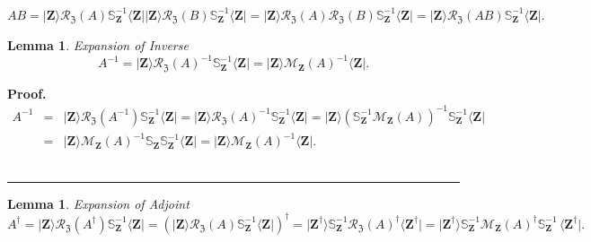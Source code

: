 \documentclass[aps, preprint]{revtex4}
\newtheorem{lemma}[theorem]{Lemma}
\newenvironment{proof}[1][Proof]{\noindent\textbf{#1.} }{\ \rule{0.5em}{0.5em}}
\begin{document}
\begin{equation}A B =\vert \mathbf{Z} \rangle \mathcal{R}_{\mathfrak{Z}} \left (A\right ) \mathbb{S}_{\mathbf{Z}}^{ -1} \langle \mathbf{Z}\vert \vert \mathbf{Z} \rangle \mathcal{R}_{\mathfrak{Z}} \left (B\right ) \mathbb{S}_{\mathbf{Z}}^{ -1} \langle \mathbf{Z}\vert  =\vert \mathbf{Z} \rangle \mathcal{R}_{\mathfrak{Z}} \left (A\right ) \mathcal{R}_{\mathfrak{Z}} \left (B\right ) \mathbb{S}_{\mathbf{Z}}^{ -1} \langle \mathbf{Z}\vert  =\vert \mathbf{Z} \rangle \mathcal{R}_{\mathfrak{Z}} \left (A B\right ) \mathbb{S}_{\mathbf{Z}}^{ -1} \langle \mathbf{Z}\vert \text{.}
\end{equation}


\begin{lemma}
Expansion of Inverse
\begin{equation}A^{ -1} =\vert \mathbf{Z} \rangle \mathcal{R}_{\mathfrak{Z}} \left (A\right )^{ -1} \mathbb{S}_{\mathbf{Z}}^{ -1} \langle \mathbf{Z}\vert  =\vert \mathbf{Z} \rangle \mathcal{M}_{\mathbf{Z}} \left (A\right )^{ -1} \langle \mathbf{Z}\vert \text{.}
\end{equation}
\end{lemma}


\begin{proof}
\begin{align}A^{ -1} &  = & \vert \mathbf{Z} \rangle \mathcal{R}_{\mathfrak{Z}} \left (A^{ -1}\right ) \mathbb{S}_{\mathbf{Z}}^{ -1} \langle \mathbf{Z}\vert  =\vert \mathbf{Z} \rangle \mathcal{R}_{\mathfrak{Z}} \left (A\right )^{ -1} \mathbb{S}_{\mathbf{Z}}^{ -1} \langle \mathbf{Z}\vert  =\vert \mathbf{Z} \rangle \left (\mathbb{S}_{\mathbf{Z}}^{ -1} \mathcal{M}_{\mathbf{Z}} \left (A\right )\right )^{ -1} \mathbb{S}_{\mathbf{Z}}^{ -1} \langle \mathbf{Z}\vert  \\
 &  = & \vert \mathbf{Z} \rangle \mathcal{M}_{\mathbf{Z}} \left (A\right )^{ -1} \mathbb{S}_{\mathbf{Z}} \mathbb{S}_{\mathbf{Z}}^{ -1} \langle \mathbf{Z}\vert  =\vert \mathbf{Z} \rangle \mathcal{M}_{\mathbf{Z}} \left (A\right )^{ -1} \langle \mathbf{Z}\vert \text{.}\end{align}
\end{proof}


\begin{lemma}
Expansion of Adjoint
\begin{equation}A^{ \dag } =\vert \mathbf{Z} \rangle \mathcal{R}_{\mathfrak{Z}} \left (A^{ \dag }\right ) \mathbb{S}_{\mathbf{Z}}^{ -1} \langle \mathbf{Z}\vert  =\left (\vert \mathbf{Z} \rangle \mathcal{R}_{\mathfrak{Z}} \left (A\right ) \mathbb{S}_{\mathbf{Z}}^{ -1} \langle \mathbf{Z}\vert \right )^{ \dag } =\vert \mathbf{Z}^{ \dag } \rangle \mathbb{S}_{\mathbf{Z}}^{ -1} \mathcal{R}_{\mathfrak{Z}} \left (A\right )^{ \dag } \langle \mathbf{Z}^{ \dag }\vert  =\vert \mathbf{Z}^{ \dag } \rangle \mathbb{S}_{\mathbf{Z}}^{ -1} \mathcal{M}_{\mathbf{Z}} \left (A\right )^{ \dag } \mathbb{S}_{\mathbf{Z}}^{ -1}\, \langle \mathbf{Z}^{ \dag }\vert \text{.}
\end{equation}
\end{lemma}
\end{document}
